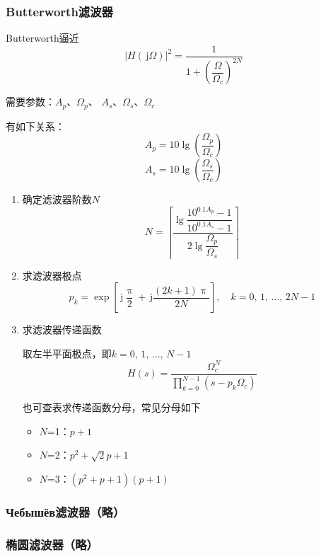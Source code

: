 \documentclass[UTF8,fontset=fandol,zihao=5]{ctexart}
\newcommand{\jj}{\,\mathrm{j}}
\begin{document}
\subsubsection{Butterworth滤波器}

Butterworth逼近
\[
\left|H(\jj\varOmega)\right|^2=\dfrac{1}{1+\left(\dfrac{\varOmega}{\varOmega_c}\right)^{2N}}
\]

\begin{methodbox}[设计Butterworth滤波器]
  
  需要参数：$A_p$、$\varOmega_p$、
  $A_s$、$\varOmega_s$、$\varOmega_c$
  
  有如下关系：
  \[
  A_p=10\lg\left(\frac{\varOmega_p}{\varOmega_c}\right)
  \]
  \[
  A_s=10\lg\left(\frac{\varOmega_s}{\varOmega_c}\right)
  \]

  \begin{enumerate}
    \item 确定滤波器阶数$N$
    \[
    N=\left\lceil\frac{\lg{\dfrac{10^{0.1A_p}-1}{10^{0.1A_s}-1}}}{2\lg {\dfrac{\varOmega_p}{\varOmega_s}}}\right\rceil
    \]

    \item 求滤波器极点
    \[
    p_k=\exp\left[\displaystyle\jj\dfrac{\uppi}{2}+\displaystyle\jj\dfrac{(2k+1)\uppi}{2N}\right], \quad k=0,\,1,\,\ldots,\,2N-1
    \]

    \item 求滤波器传递函数
    
    取左半平面极点，即$k=0,\,1,\,\ldots,\,N-1$
    \[
    H(s)=\frac{\varOmega_c^N}{\displaystyle\prod_{k=0}^{N-1}(s-p_k\varOmega_c)}
    \]

    也可查表求传递函数分母，常见分母如下
    \begin{itemize}
      \item $N$=1：$p+1$
      \item $N$=2：$p^2+\sqrt{2}p+1$
      \item $N$=3：$(p^2+p+1)(p+1)$
    \end{itemize}
  \end{enumerate}
\end{methodbox}

\subsubsection{\russianfont Чебышёв滤波器（略）}

\subsubsection{椭圆滤波器（略）}
\end{document}
